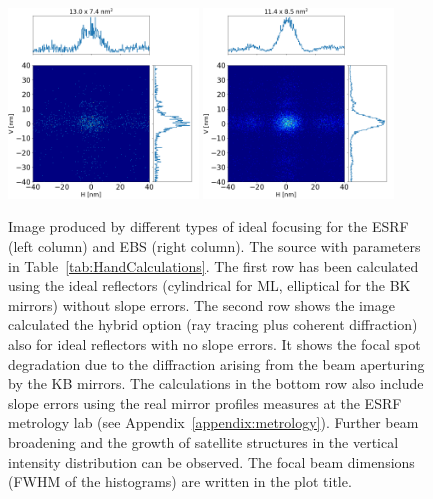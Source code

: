 \documentclass{iucr}              %
\begin{document}
\begin{figure}
\includegraphics[width=0.45\textwidth]{GRAPHICS/hybriderrorsESRF.png}
\includegraphics[width=0.45\textwidth]{GRAPHICS/hybriderrorsEBS.png}
\caption{Image produced by different types of ideal focusing for the ESRF (left column) and EBS (right column). The source with parameters in Table~\ref{tab:HandCalculations}. 
The first row has been calculated using the ideal reflectors (cylindrical for ML, elliptical for the BK mirrors) without slope errors. 
The second row shows the image calculated the hybrid option (ray tracing plus coherent diffraction) also for ideal reflectors with no slope errors. It shows the focal spot degradation due to the diffraction arising from the beam aperturing by the KB mirrors. The calculations in the bottom row also include slope errors using the real mirror profiles measures at the ESRF metrology lab (see Appendix~\ref{appendix:metrology}).  Further beam broadening and the growth of satellite structures in the vertical intensity distribution can be observed. 
The focal beam dimensions (FWHM of the histograms) are written in the plot title.
}
\end{figure}
\end{document}
